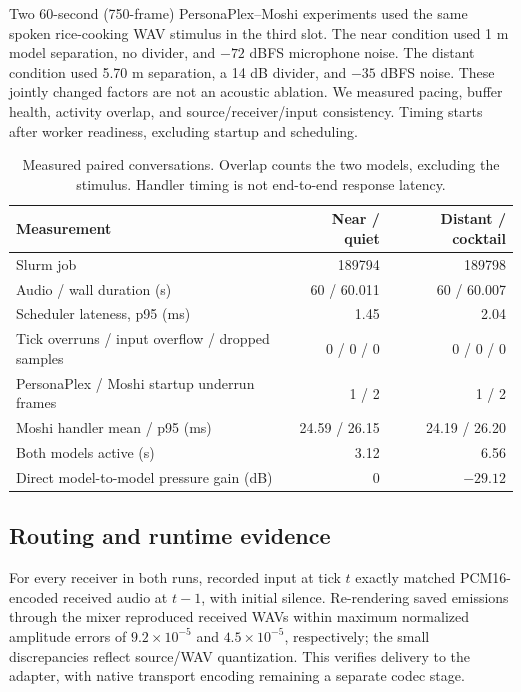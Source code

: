 \documentclass{article}
\begin{document}
Two 60-second (750-frame) PersonaPlex--Moshi experiments used the same spoken rice-cooking WAV stimulus in the third slot. The near condition used 1 m model separation, no divider, and $-72$ dBFS microphone noise. The distant condition used 5.70 m separation, a 14 dB divider, and $-35$ dBFS noise. These jointly changed factors are not an acoustic ablation. We measured pacing, buffer health, activity overlap, and source/receiver/input consistency. Timing starts after worker readiness, excluding startup and scheduling.

\begin{table}[t]
\centering
\caption{Measured paired conversations. Overlap counts the two models, excluding the stimulus. Handler timing is not end-to-end response latency.}
\label{tab:pair}
\begin{tabular}{lrr}\toprule
\rowcolor{MuCream}
Measurement & Near / quiet & Distant / cocktail\\\midrule
Slurm job & 189794 & 189798\\
Audio / wall duration (s) & 60 / 60.011 & 60 / 60.007\\
Scheduler lateness, p95 (ms) & 1.45 & 2.04\\
Tick overruns / input overflow / dropped samples & 0 / 0 / 0 & 0 / 0 / 0\\
PersonaPlex / Moshi startup underrun frames & 1 / 2 & 1 / 2\\
Moshi handler mean / p95 (ms) & 24.59 / 26.15 & 24.19 / 26.20\\
Both models active (s) & 3.12 & 6.56\\
Direct model-to-model pressure gain (dB) & 0 & $-29.12$\\\bottomrule
\end{tabular}
\end{table}

\subsection{Routing and runtime evidence}
For every receiver in both runs, recorded input at tick $t$ exactly matched PCM16-encoded received audio at $t-1$, with initial silence. Re-rendering saved emissions through the mixer reproduced received WAVs within maximum normalized amplitude errors of $9.2\times10^{-5}$ and $4.5\times10^{-5}$, respectively; the small discrepancies reflect source/WAV quantization. This verifies delivery to the adapter, with native transport encoding remaining a separate codec stage.
\end{document}
